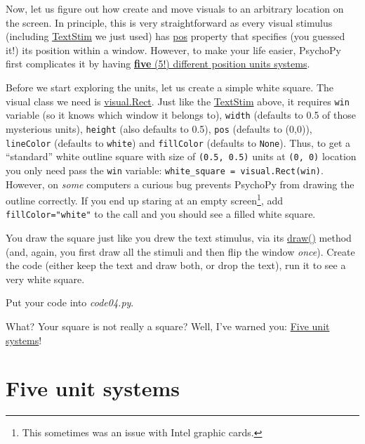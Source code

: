 \documentclass[
]{book}
\begin{document}
Now, let us figure out how create and move visuals to an arbitrary location on the screen. In principle, this is very straightforward as every visual stimulus (including \href{https://psychopy.org/api/visual/textstim.html\#psychopy.visual.TextStim}{TextStim} we just used) has \href{https://psychopy.org/api/visual/textstim.html\#psychopy.visual.TextStim.pos}{pos} property that specifies (you guessed it!) its position within a window. However, to make your life easier, PsychoPy first complicates it by having \href{https://psychopy.org/general/units.html}{\textbf{five} (5!) different position units systems}.

Before we start exploring the units, let us create a simple white square. The visual class we need is \href{https://psychopy.org/api/visual/rect.html}{visual.Rect}. Just like the \href{https://psychopy.org/api/visual/textstim.html\#psychopy.visual.TextStim}{TextStim} above, it requires \texttt{win} variable (so it knows which window it belongs to), \texttt{width} (defaults to 0.5 of those mysterious units), \texttt{height} (also defaults to 0.5), \texttt{pos} (defaults to (0,0)), \texttt{lineColor} (defaults to \texttt{white}) and \texttt{fillColor} (defaults to \texttt{None}). Thus, to get a ``standard'' white outline square with size of \texttt{(0.5,\ 0.5)} units at \texttt{(0,\ 0)} location you only need pass the \texttt{win} variable: \texttt{white\_square\ =\ visual.Rect(win)}. However, on \emph{some} computers a curious bug prevents PsychoPy from drawing the outline correctly. If you end up staring at an empty screen\footnote{This sometimes was an issue with Intel graphic cards.}, add \texttt{fillColor="white"} to the call and you should see a filled white square.

You draw the square just like you drew the text stimulus, via its \href{https://psychopy.org/api/visual/rect.html\#psychopy.visual.rect.Rect.draw}{draw()} method (and, again, you first draw all the stimuli and then flip the window \emph{once}). Create the code (either keep the text and draw both, or drop the text), run it to see a very white square.

Put your code into \emph{code04.py}.

What? Your square is not really a square? Well, I've warned you: \href{https://psychopy.org/general/units.html\#units}{Five unit systems}!

\hypertarget{psychopy-units}{%
\section{Five unit systems}\label{psychopy-units}}
\end{document}
